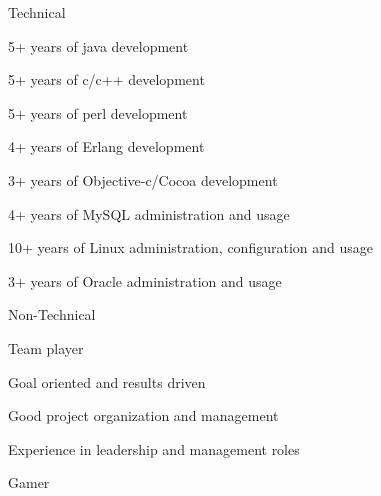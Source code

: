 \documentclass[10pt,letterpaper]{article}
\newenvironment{indentsection}[1]%
{\begin{list}{}%
  {\setlength{\leftmargin}{#1}}%
  \item[]%
}
{\end{list}}
\begin{document}
\begin{indentsection}{\parindent}
Technical
\begin{itemize*}
        \item 5+ years of java development
        \item 5+ years of c/c++ development
        \item 5+ years of perl development
        \item 4+ years of Erlang development
        \item 3+ years of Objective-c/Cocoa development
        \item 4+ years of MySQL administration and usage
        \item 10+ years of Linux administration, configuration and usage
        \item 3+ years of Oracle administration and usage
\end{itemize*}
Non-Technical
\begin{itemize*}
        \item Team player
        \item Goal oriented and results driven
        \item Good project organization and management
        \item Experience in leadership and management roles
        \item Gamer
\end{itemize*}

\end{indentsection}
\end{document}
